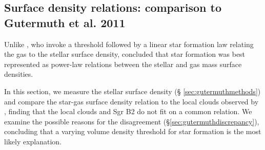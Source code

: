 \documentclass[twocolumn]{aastex61}
\begin{document}
% 
% 

\subsection{Surface density relations: comparison to Gutermuth et al. 2011}
\label{sec:gutermuth}
Unlike \citet{Lada2010a}, who invoke a threshold followed by a linear star
formation law relating the gas to the stellar surface density,
\citet{Gutermuth2011a} concluded that star formation was best represented as
power-law relations between the stellar and gas mass surface densities.

In this section, we measure the stellar surface density (\S
\ref{sec:gutermuthmethods}) and compare the star-gas surface density relation
to the local clouds observed by \citet[][\S
\ref{sec:gutermuthcomparison}]{Gutermuth2011a}, finding that the local clouds
and Sgr B2 do not fit on a common relation.  We examine the possible reasons
for the disagreement (\S \ref{sec:gutermuthdiscrepancy}), concluding that a
varying volume density threshold for star formation is the most likely
explanation.
\end{document}
